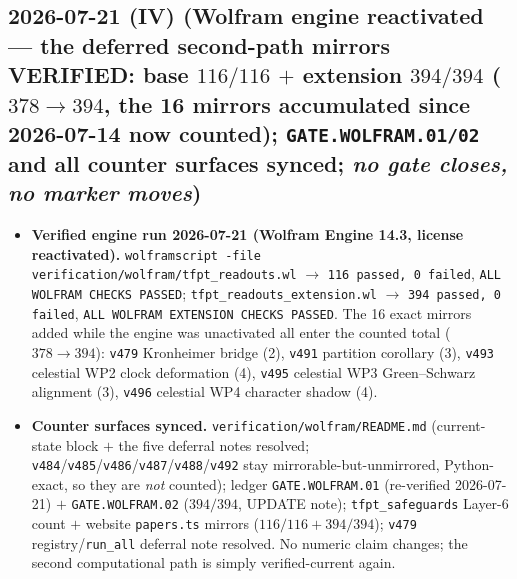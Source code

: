 \documentclass[11pt]{article}
\begin{document}
\subsection*{2026-07-21 (IV) (Wolfram engine reactivated --- the deferred second-path mirrors VERIFIED: base $116/116$ $+$ extension $394/394$ ($378\to394$, the 16 mirrors accumulated since 2026-07-14 now counted); \texttt{GATE.WOLFRAM.01/02} and all counter surfaces synced; \emph{no gate closes, no marker moves})}
\begin{itemize}[leftmargin=1.5em]
\item \textbf{Verified engine run 2026-07-21 (Wolfram Engine 14.3, license reactivated).}
\texttt{wolframscript -file verification/wolfram/tfpt\_readouts.wl} $\to$ \texttt{116 passed, 0 failed},
\texttt{ALL WOLFRAM CHECKS PASSED}; \texttt{tfpt\_readouts\_extension.wl} $\to$ \texttt{394 passed, 0
failed}, \texttt{ALL WOLFRAM EXTENSION CHECKS PASSED}. The 16 exact mirrors added while the engine was
unactivated all enter the counted total ($378\to394$): \texttt{v479} Kronheimer bridge (2), \texttt{v491}
partition corollary (3), \texttt{v493} celestial WP2 clock deformation (4), \texttt{v495} celestial WP3
Green--Schwarz alignment (3), \texttt{v496} celestial WP4 character shadow (4).
\item \textbf{Counter surfaces synced.} \texttt{verification/wolfram/README.md} (current-state block
$+$ the five deferral notes resolved; \texttt{v484}/\texttt{v485}/\texttt{v486}/\texttt{v487}/\texttt{v488}/\texttt{v492}
stay mirrorable-but-unmirrored, Python-exact, so they are \emph{not} counted); ledger
\texttt{GATE.WOLFRAM.01} (re-verified 2026-07-21) $+$ \texttt{GATE.WOLFRAM.02} ($394/394$, UPDATE note);
\texttt{tfpt\_safeguards} Layer-6 count $+$ website \texttt{papers.ts} mirrors ($116/116 + 394/394$);
\texttt{v479} registry/\texttt{run\_all} deferral note resolved. No numeric claim changes; the second
computational path is simply verified-current again.
\end{itemize}
\end{document}
